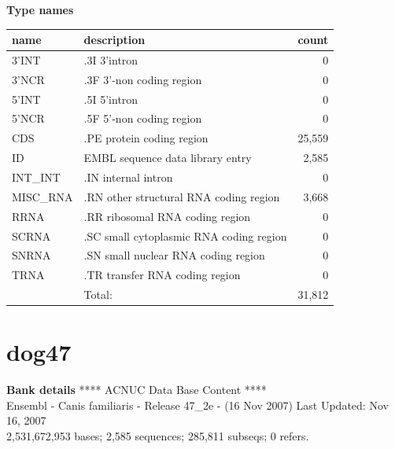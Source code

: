 \documentclass{article}
\begin{document}
\begin{Schunk}
\textbf{Type names}
\noindent\begin{tabular}{llr}
\hline \hline
name & description & count \\
\hline
3'INT  &  .3I 3'intron  &  0 \\
3'NCR  &  .3F  3'-non coding region  &  0 \\
5'INT  &  .5I 5'intron  &  0 \\
5'NCR  &  .5F  5'-non coding region  &  0 \\
CDS  &  .PE protein coding region  &  25,559 \\
ID  &  EMBL sequence data library entry  &  2,585 \\
INT\_INT  &  .IN  internal intron  &  0 \\
MISC\_RNA  &  .RN other structural RNA coding region  &  3,668 \\
RRNA  &  .RR ribosomal RNA coding region  &  0 \\
SCRNA  &  .SC small cytoplasmic RNA coding region  &  0 \\
SNRNA  &  .SN small nuclear RNA coding region  &  0 \\
TRNA  &  .TR transfer RNA coding region  &  0 \\
\hline
 & Total: & 31,812 \\
\hline \hline
\end{tabular}

\section{ dog47 }
\textbf{Bank details}
             ****     ACNUC Data Base Content      ****                         \\
Ensembl - Canis familiaris - Release 47\_2e - (16 Nov 2007) Last Updated: Nov 16, 2007\\
2,531,672,953 bases; 2,585 sequences; 285,811 subseqs; 0 refers.


\end{Schunk}
\end{document}
